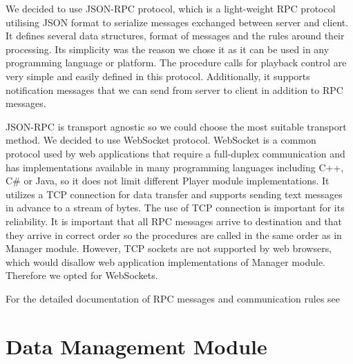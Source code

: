 \par
We decided to use JSON-RPC protocol, which is a light-weight RPC protocol utilising JSON format to serialize messages exchanged between server and client. It defines several data structures, format of messages and the rules around their processing. Its simplicity was the reason we chose it as it can be used in any programming language or platform. The procedure calls for playback control are very simple and easily defined in this protocol. Additionally, it supports notification messages that we can send from server to client in addition to RPC messages.
\par
JSON-RPC is transport agnostic so we could choose the most suitable transport method. We decided to use WebSocket protocol. WebSocket is a common protocol used by web applications that require a full-duplex communication and has implementations available in many programming languages including C++, C\# or Java, so it does not limit different Player module implementations. It utilizes a TCP connection for data transfer and supports sending text messages in advance to a stream of bytes. The use of TCP connection is important for its reliability. It is important that all RPC messages arrive to destination and that they arrive in correct order so the procedures are called in the same order as in Manager module. However, TCP sockets are not supported by web browsers, which would disallow web application implementations of Manager module. Therefore we opted for WebSockets.
\par
For the detailed documentation of RPC messages and communication rules see 

\section{Data Management Module}

